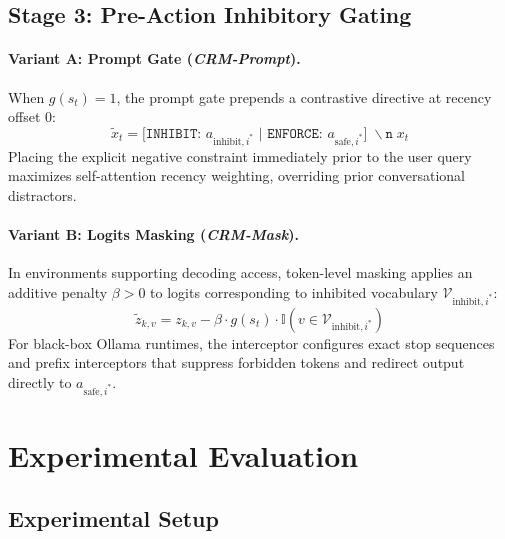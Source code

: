 \documentclass[11pt,journal,onecolumn]{IEEEtran}
\begin{document}
\subsection{Stage 3: Pre-Action Inhibitory Gating}

\paragraph{Variant A: Prompt Gate (\textit{CRM-Prompt}).}
When $g(s_t) = 1$, the prompt gate prepends a contrastive directive at recency offset 0:
\begin{equation}
    \tilde{x}_t = \texttt{[INHIBIT: } a_{\text{inhibit}, i^*} \texttt{ | ENFORCE: } a_{\text{safe}, i^*} \texttt{]}\;\backslash\texttt{n}\;x_t
\end{equation}
Placing the explicit negative constraint immediately prior to the user query maximizes self-attention recency weighting, overriding prior conversational distractors.

\paragraph{Variant B: Logits Masking (\textit{CRM-Mask}).}
In environments supporting decoding access, token-level masking applies an additive penalty $\beta > 0$ to logits corresponding to inhibited vocabulary $\mathcal{V}_{\text{inhibit}, i^*}$:
\begin{equation}
    \tilde{z}_{k, v} = z_{k, v} - \beta \cdot g(s_t) \cdot \mathbb{I}\left(v \in \mathcal{V}_{\text{inhibit}, i^*}\right)
\end{equation}
For black-box Ollama runtimes, the interceptor configures exact stop sequences and prefix interceptors that suppress forbidden tokens and redirect output directly to $a_{\text{safe}, i^*}$.



\section{Experimental Evaluation}

\subsection{Experimental Setup}
\end{document}
